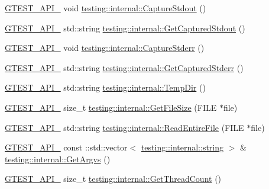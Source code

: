 \begin{DoxyCompactItemize}
\item 
\hyperlink{gtest-port_8h_aa73be6f0ba4a7456180a94904ce17790}{G\+T\+E\+S\+T\+\_\+\+A\+P\+I\+\_\+} void \hyperlink{namespacetesting_1_1internal_acba06d4f0343dec407738ba5544af990}{testing\+::internal\+::\+Capture\+Stdout} ()
\item 
\hyperlink{gtest-port_8h_aa73be6f0ba4a7456180a94904ce17790}{G\+T\+E\+S\+T\+\_\+\+A\+P\+I\+\_\+} std\+::string \hyperlink{namespacetesting_1_1internal_aed657219a9856a8d249a3230de0c54ce}{testing\+::internal\+::\+Get\+Captured\+Stdout} ()
\item 
\hyperlink{gtest-port_8h_aa73be6f0ba4a7456180a94904ce17790}{G\+T\+E\+S\+T\+\_\+\+A\+P\+I\+\_\+} void \hyperlink{namespacetesting_1_1internal_a8ec00d458d0d442bd64af7b5f9c22dda}{testing\+::internal\+::\+Capture\+Stderr} ()
\item 
\hyperlink{gtest-port_8h_aa73be6f0ba4a7456180a94904ce17790}{G\+T\+E\+S\+T\+\_\+\+A\+P\+I\+\_\+} std\+::string \hyperlink{namespacetesting_1_1internal_a374156401da17704099d0c33fa53adfb}{testing\+::internal\+::\+Get\+Captured\+Stderr} ()
\item 
\hyperlink{gtest-port_8h_aa73be6f0ba4a7456180a94904ce17790}{G\+T\+E\+S\+T\+\_\+\+A\+P\+I\+\_\+} std\+::string \hyperlink{namespacetesting_1_1internal_a59a959f437bd7d515b5c41dcf00229c9}{testing\+::internal\+::\+Temp\+Dir} ()
\item 
\hyperlink{gtest-port_8h_aa73be6f0ba4a7456180a94904ce17790}{G\+T\+E\+S\+T\+\_\+\+A\+P\+I\+\_\+} size\+\_\+t \hyperlink{namespacetesting_1_1internal_a06ca3f65f5e85c9ce7299b9e4cd52408}{testing\+::internal\+::\+Get\+File\+Size} (F\+I\+LE $\ast$file)
\item 
\hyperlink{gtest-port_8h_aa73be6f0ba4a7456180a94904ce17790}{G\+T\+E\+S\+T\+\_\+\+A\+P\+I\+\_\+} std\+::string \hyperlink{namespacetesting_1_1internal_a2cc0be60c54a8701423fe5297e1349ee}{testing\+::internal\+::\+Read\+Entire\+File} (F\+I\+LE $\ast$file)
\item 
\hyperlink{gtest-port_8h_aa73be6f0ba4a7456180a94904ce17790}{G\+T\+E\+S\+T\+\_\+\+A\+P\+I\+\_\+} const \+::std\+::vector$<$ \hyperlink{namespacetesting_1_1internal_a8e8ff5b11e64078831112677156cb111}{testing\+::internal\+::string} $>$ \& \hyperlink{namespacetesting_1_1internal_a344160f771a3b754fa4e54b6e9846b23}{testing\+::internal\+::\+Get\+Argvs} ()
\item 
\hyperlink{gtest-port_8h_aa73be6f0ba4a7456180a94904ce17790}{G\+T\+E\+S\+T\+\_\+\+A\+P\+I\+\_\+} size\+\_\+t \hyperlink{namespacetesting_1_1internal_a3b9b3649cd04558bf46c75de52a7ef34}{testing\+::internal\+::\+Get\+Thread\+Count} ()

\end{DoxyCompactItemize}
